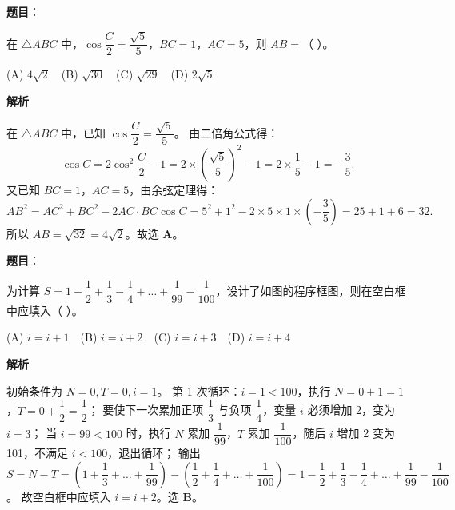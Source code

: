 \begin{answer}

\textbf{题目}：

在 $\triangle ABC$ 中，$\cos\dfrac C2 = \dfrac{\sqrt5}{5}$，$BC=1$，$AC=5$，则 $AB=$（ ）。

(A) $4\sqrt2$　(B) $\sqrt{30}$　(C) $\sqrt{29}$　(D) $2\sqrt5$

\textbf{解析}

在 $\triangle ABC$ 中，已知 $\cos\dfrac C2 = \dfrac{\sqrt5}{5}$。
由二倍角公式得：
\nopagebreak[4]
\[\cos C = 2\cos^2\dfrac C2 - 1 = 2\times\left(\dfrac{\sqrt5}{5}\right)^2 - 1 = 2\times\dfrac15 - 1 = -\dfrac35.\]
又已知 $BC = 1$，$AC = 5$，由余弦定理得：
\nopagebreak[4]
\[AB^2 = AC^2 + BC^2 - 2AC\cdot BC\cos C = 5^2 + 1^2 - 2\times 5\times 1\times\left(-\dfrac35\right) = 25 + 1 + 6 = 32.\]
所以 $AB = \sqrt{32} = 4\sqrt2$。故选 \textbf{A}。


\end{answer}
\begin{answer}

\textbf{题目}：

为计算 $S=1-\dfrac12+\dfrac13-\dfrac14+\dots+\dfrac{1}{99}-\dfrac{1}{100}$，设计了如图的程序框图，则在空白框中应填入（ ）。
\nopagebreak[4]
\begin{center}\end{center}
\nopagebreak[4]
(A) $i=i+1$　(B) $i=i+2$　(C) $i=i+3$　(D) $i=i+4$

\textbf{解析}

初始条件为 $N=0, T=0, i=1$。
第 1 次循环：$i=1<100$，执行 $N = 0 + 1 = 1$，$T = 0 + \dfrac12 = \dfrac12$；
要使下一次累加正项 $\dfrac13$ 与负项 $\dfrac14$，变量 $i$ 必须增加 2，变为 $i=3$；
当 $i=99<100$ 时，执行 $N$ 累加 $\dfrac{1}{99}$，$T$ 累加 $\dfrac{1}{100}$，随后 $i$ 增加 2 变为 101，不满足 $i<100$，退出循环；
输出 $S = N - T = \left(1+\dfrac13+\dots+\dfrac{1}{99}\right) - \left(\dfrac12+\dfrac14+\dots+\dfrac{1}{100}\right) = 1-\dfrac12+\dfrac13-\dfrac14+\dots+\dfrac{1}{99}-\dfrac{1}{100}$。
故空白框中应填入 $i=i+2$。选 \textbf{B}。


\end{answer}
